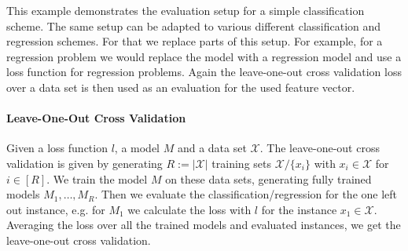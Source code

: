 This example demonstrates the evaluation setup for a simple classification scheme. The same setup can be adapted to various different classification and regression schemes. For that we replace parts of this setup. For example, for a regression problem we would replace the model with a regression model and use a loss function for regression problems. Again the leave-one-out cross validation loss over a data set is then used as an evaluation for the used feature vector.
\paragraph{Leave-One-Out Cross Validation}
Given a loss function $l$, a model $M$ and a data set $\mathcal{X}$. The leave-one-out cross validation is given by generating $R := |\mathcal{X}|$ training sets $\mathcal{X}/\{x_i\}$ with $x_i \in \mathcal{X}$ for $i \in [R]$. We train the model $M$ on these data sets, generating fully trained models $M_1, \dots, M_R$. Then we evaluate the classification/regression for the one left out instance, e.g. for $M_1$ we calculate the loss with $l$ for the instance $x_1 \in \mathcal{X}$.
Averaging the loss over all the trained models and evaluated instances, we get the leave-one-out cross validation.







